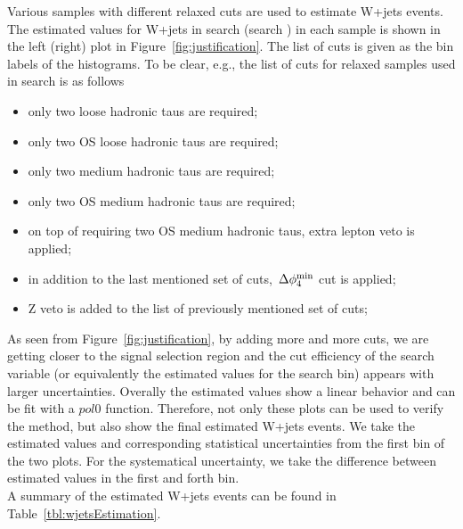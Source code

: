 Various samples with different relaxed cuts are used to estimate W+jets events. The estimated values 
for W+jets in search \binone (search \bintwo) in each sample is shown in the left (right) plot 
in Figure~\ref{fig:justification}. The list of cuts is given as the bin labels of the histograms. To be clear, e.g., 
the list of cuts for relaxed samples used in search \binone is as follows   
\begin{itemize}
\item only two loose hadronic taus are required;
\item only two OS loose hadronic taus are required;
\item only two medium hadronic taus are required;
\item only two OS medium hadronic taus are required;
\item on top of requiring two OS medium hadronic taus, extra lepton veto is applied;
\item in addition to the last mentioned set of cuts, $\,{\Delta\phi_{4}^{\rm min}}$ cut is applied;
\item Z veto is added to the list of previously mentioned set of cuts;
 \end{itemize}
As seen from Figure~\ref{fig:justification}, by adding more and more cuts, we are getting closer to the signal selection region 
and the cut efficiency of the search variable (or equivalently the estimated values for the search bin) 
appears with larger uncertainties. Overally the estimated values show a linear behavior and can be fit with a $pol0$ function. 
Therefore, not only these plots can be used to verify the method, but also show the final estimated W+jets events. We take the estimated 
values and corresponding statistical uncertainties from the first bin of the two plots. For the systematical uncertainty, we take the
difference between estimated values in the first and forth bin.\\
A summary of the estimated W+jets events can be found in Table~\ref{tbl:wjetsEstimation}. 


